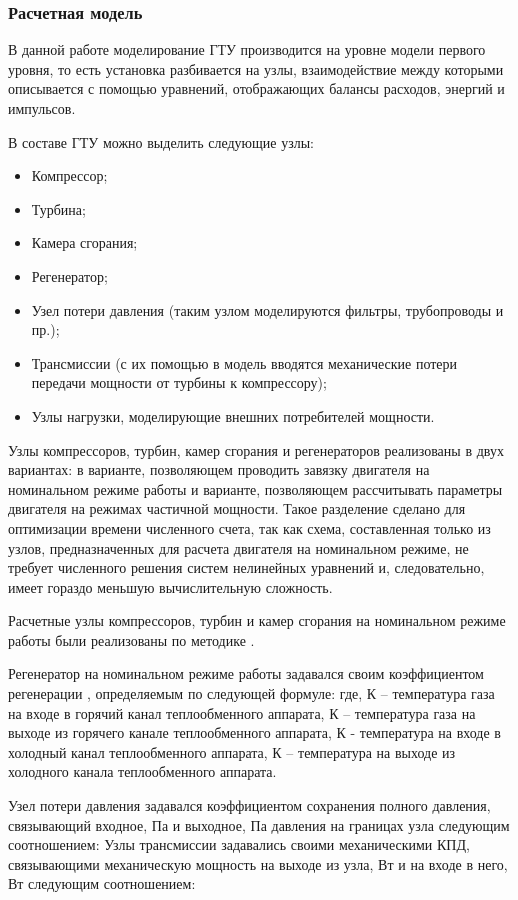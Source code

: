 \subsubsection{Расчетная модель}

В данной работе моделирование ГТУ производится на уровне модели первого уровня, то есть установка разбивается на узлы, взаимодействие между которыми описывается с помощью уравнений, отображающих балансы расходов, энергий и импульсов.

В составе ГТУ можно выделить следующие узлы:
\begin{itemize}
	\item Компрессор;
	\item Турбина;
	\item Камера сгорания;
	\item Регенератор;
	\item Узел потери давления (таким узлом моделируются фильтры, трубопроводы и пр.);
	\item Трансмиссии (с их помощью в модель вводятся механические потери передачи мощности от турбины к компрессору);
	\item Узлы нагрузки, моделирующие внешних потребителей мощности.
\end{itemize}

Узлы компрессоров, турбин, камер сгорания и регенераторов реализованы в двух вариантах: в варианте, позволяющем проводить завязку двигателя на номинальном режиме работы и варианте, позволяющем рассчитывать параметры двигателя на режимах частичной мощности. Такое разделение сделано для оптимизации времени численного счета, так как схема, составленная только из узлов, предназначенных для расчета двигателя на номинальном режиме, не требует численного решения систем нелинейных уравнений и, следовательно, имеет гораздо меньшую вычислительную сложность. 

Расчетные узлы компрессоров, турбин и камер сгорания на номинальном режиме работы были реализованы по методике \cite{cycle_methodics}.

Регенератор на номинальном режиме работы задавался своим коэффициентом регенерации , определяемым по следующей формуле:
где, К – температура газа на входе в горячий канал теплообменного аппарата, К – температура газа на выходе из горячего канале теплообменного аппарата, К - температура на входе в холодный канал теплообменного аппарата, К – температура на выходе из холодного канала теплообменного аппарата.

Узел потери давления задавался коэффициентом сохранения полного давления, связывающий входное, Па и выходное, Па давления на границах узла следующим соотношением:
Узлы трансмиссии задавались своими механическими КПД, связывающими механическую мощность на выходе из узла, Вт и на входе в него, Вт следующим соотношением:

